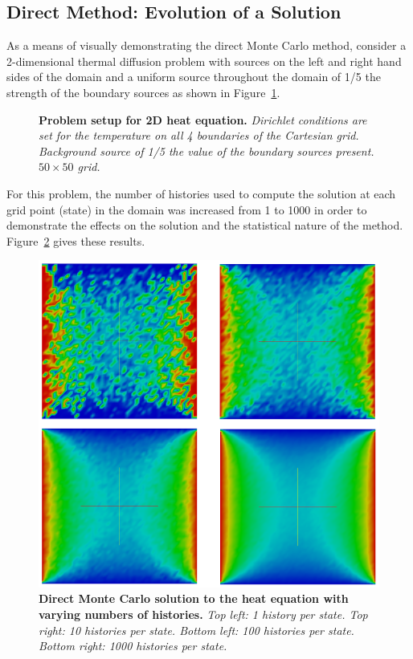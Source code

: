 \subsection{Direct Method: Evolution of a Solution}
\label{subsec:direct_evolution}
As a means of visually demonstrating the direct Monte Carlo method,
consider a 2-dimensional thermal diffusion problem with sources on the
left and right hand sides of the domain and a uniform source
throughout the domain of 1/5 the strength of the boundary sources as
shown in Figure~\ref{fig:heat_setup}.
\begin{figure}[t!]
  \begin{center}
    \scalebox{1.2}{  }
  \end{center}
  \caption{\textbf{Problem setup for 2D heat equation.}
    \textit{Dirichlet conditions are set for the temperature on all 4
      boundaries of the Cartesian grid. Background source of 1/5 the
      value of the boundary sources present. $50 \times 50$ grid.}}
  \label{fig:heat_setup}
\end{figure}
For this problem, the number of histories used to compute the solution
at each grid point (state) in the domain was increased from 1 to 1000
in order to demonstrate the effects on the solution and the
statistical nature of the method. Figure~\ref{fig:direct_evolution}
gives these results.
\begin{figure}[t!]
  \begin{center}
    \includegraphics[width=6in]{chapters/mc_background/direct_evolution.png}
  \end{center}
  \caption{\textbf{Direct Monte Carlo solution to the heat equation
      with varying numbers of histories.} \textit{Top left: 1 history
      per state. Top right: 10 histories per state. Bottom left: 100
      histories per state. Bottom right: 1000 histories per state.}}
  \label{fig:direct_evolution}
\end{figure}
